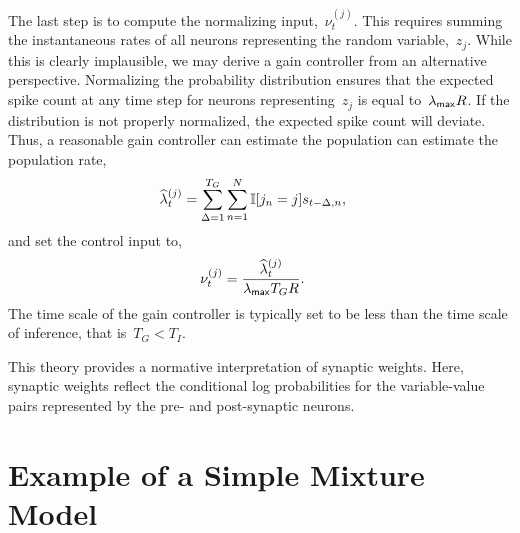 The last step is to compute the normalizing input,~$\nu_t^{(j)}$.
This requires summing the instantaneous rates of all neurons representing the
random variable,~$z_j$. While this is clearly implausible, we may derive
a gain controller from an alternative perspective. Normalizing the
probability distribution ensures that the expected spike count at
any time step for
neurons representing~$z_j$ is equal to~$\lambda_{\mathsf{max}} R$. If the distribution
is not properly normalized, the expected spike count will deviate.
Thus, a reasonable gain controller can estimate the population
can estimate the population rate,
\begin{align*}
\widehat{\lambda}_{t}^{(j)} &= \sum_{\Delta = 1}^{T_G} \sum_{n=1}^N \mathbb{I}[j_n=j] s_{t-\Delta, n},
\end{align*}
and set the control input to,
\begin{align*}
  \nu_{t}^{(j)} &= \frac{\widehat{\lambda}_{t}^{(j)}}{\lambda_{\mathsf{max}} T_G R}.
\end{align*}
The time scale of the gain controller is typically set to be
less than the time scale of inference, that is~$T_G < T_I$.


This theory provides a normative interpretation of synaptic weights.
Here, synaptic weights reflect the conditional log probabilities
for the variable-value pairs represented by the pre- and post-synaptic
neurons.

\section{Example of a Simple Mixture Model}
\label{sec:mixture_example}

